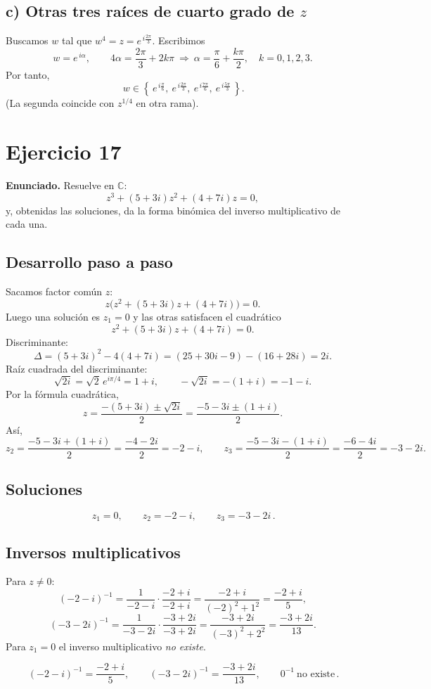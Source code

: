 \documentclass[fleqn]{article}
\begin{document}
\subsection*{c) Otras tres raíces de cuarto grado de $z$}
Buscamos $w$ tal que $w^4=z=e^{\,i\frac{2\pi}{3}}$. Escribimos
\[
w=e^{\,i\alpha},\qquad 4\alpha=\frac{2\pi}{3}+2k\pi \ \Rightarrow\ 
\alpha=\frac{\pi}{6}+\frac{k\pi}{2},\quad k=0,1,2,3.
\]
Por tanto,
\[
\boxed{\,w\in\left\{\,e^{\,i\frac{\pi}{6}},\ e^{\,i\frac{2\pi}{3}},\ e^{\,i\frac{7\pi}{6}},\ e^{\,i\frac{5\pi}{3}}\,\right\}.}
\]
(La segunda coincide con $z^{1/4}$ en otra rama).
\section*{Ejercicio 17}
\textbf{Enunciado.} Resuelve en $\mathbb{C}$:
\[
z^3+(5+3i)z^2+(4+7i)z=0,
\]
y, obtenidas las soluciones, da la forma binómica del inverso multiplicativo de cada una.

\subsection*{Desarrollo paso a paso}
Sacamos factor común $z$:
\[
z\Big(z^2+(5+3i)z+(4+7i)\Big)=0.
\]
Luego una solución es $z_1=0$ y las otras satisfacen el cuadrático
\[
z^2+(5+3i)z+(4+7i)=0.
\]
Discriminante:
\[
\Delta=(5+3i)^2-4(4+7i)=(25+30i-9)-(16+28i)=2i.
\]
Raíz cuadrada del discriminante:
\[
\sqrt{2i}=\sqrt{2}\,e^{i\pi/4}=1+i,
\qquad -\sqrt{2i}=-(1+i)=-1-i.
\]
Por la fórmula cuadrática,
\[
z=\frac{-(5+3i)\pm \sqrt{2i}}{2}
=\frac{-5-3i\pm(1+i)}{2}.
\]
Así,
\[
z_2=\frac{-5-3i+(1+i)}{2}=\frac{-4-2i}{2}=-2-i,\qquad
z_3=\frac{-5-3i-(1+i)}{2}=\frac{-6-4i}{2}=-3-2i.
\]

\subsection*{Soluciones}
\[
\boxed{\,z_1=0,\qquad z_2=-2-i,\qquad z_3=-3-2i\, }.
\]

\subsection*{Inversos multiplicativos}
Para $z\neq 0$:
\[
(-2-i)^{-1}=\frac{1}{-2-i}\cdot\frac{-2+i}{-2+i}
=\frac{-2+i}{(-2)^2+1^2}
=\frac{-2+i}{5},
\]
\[
(-3-2i)^{-1}=\frac{1}{-3-2i}\cdot\frac{-3+2i}{-3+2i}
=\frac{-3+2i}{(-3)^2+2^2}
=\frac{-3+2i}{13}.
\]
Para $z_1=0$ el inverso multiplicativo \emph{no existe}.

\[
\boxed{\,(-2-i)^{-1}=\dfrac{-2+i}{5},\qquad
(-3-2i)^{-1}=\dfrac{-3+2i}{13},\qquad
0^{-1}\ \text{no existe}\, }.
\]
\end{document}

